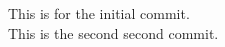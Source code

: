 \documentclass[12pt]{article}
\begin{document}
	This is for the initial commit.	
	\\ This is the second second commit.
\end{document}
